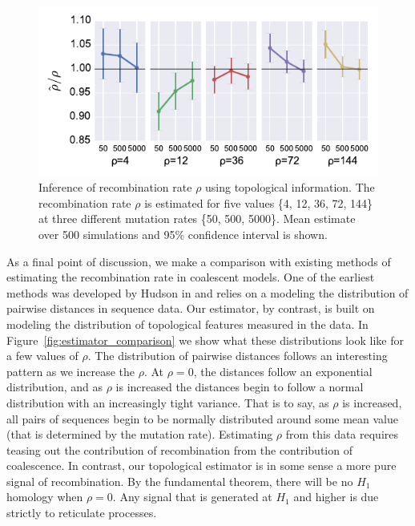 \begin{figure}
\centering
\includegraphics[width=\columnwidth]{./fig/parametric_inference/param_inference.pdf}
\caption[Inference of recombination rate $\rho$ using topological information]{Inference of recombination rate $\rho$ using topological information. The recombination rate $\rho$ is estimated for five values \{4, 12, 36, 72, 144\} at three different mutation rates \{50, 500, 5000\}. Mean estimate over 500 simulations and 95\% confidence interval is shown.}
\label{fig:param_inference}
\end{figure}

As a final point of discussion, we make a comparison with existing methods of estimating the recombination rate in coalescent models.
One of the earliest methods was developed by Hudson in \cite{Hudson:1987fo} and relies on a modeling the distribution of pairwise distances in sequence data.
Our estimator, by contrast, is built on modeling the distribution of topological features measured in the data.
In Figure~\ref{fig:estimator_comparison} we show what these distributions look like for a few values of $\rho$.
The distribution of pairwise distances follows an interesting pattern as we increase the $\rho$.
At $\rho=0$, the distances follow an exponential distribution, and as $\rho$ is increased the distances begin to follow a normal distribution with an increasingly tight variance.
That is to say, as $\rho$ is increased, all pairs of sequences begin to be normally distributed around some mean value (that is determined by the mutation rate).
Estimating $\rho$ from this data requires teasing out the contribution of recombination from the contribution of coalescence.
In contrast, our topological estimator is in some sense a more pure signal of recombination.
By the fundamental theorem, there will be no $H_1$ homology when $\rho=0$.
Any signal that is generated at $H_1$ and higher is due strictly to reticulate processes.

